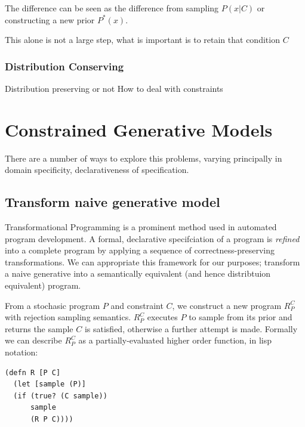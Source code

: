 The difference can be seen as the difference from sampling $P(x\vert C)$ or constructing a new prior $P^*(x)$.

This alone is not a large step, what is important is to retain that condition $C$



\subsection{Distribution Conserving}
Distribution preserving or not
How to deal with constraints


\chapter{Constrained Generative Models}
There are a number of ways to explore this problems, varying principally in domain specificity, declarativeness of specification.

\section{Transform naive generative model}
Transformational Programming is a prominent method used in automated program development.
A formal, declarative specifciation of a program is {\em refined} into a complete program by applying a sequence of correctness-preserving transformations.
We can appropriate this framework for our purposes; transform a naive generative into a semantically equivalent (and hence distribtuion equivalent) program.

From a stochasic program $P$ and constraint $C$, we construct a new program $R_P^C$ with rejection sampling semantics.
$R_P^C$ executes $P$ to sample from its prior and returns the sample $C$ is satisfied, otherwise a further attempt is made.
Formally we can describe $R_P^C$ as a partially-evaluated higher order function, in lisp notation:

\begin{verbatim}
(defn R [P C]
  (let [sample (P)]
  (if (true? (C sample))
      sample
      (R P C))))
\end{verbatim}

